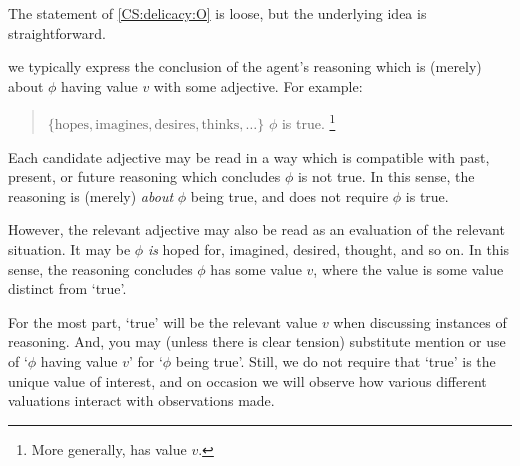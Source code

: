 \begin{note}
  The statement of \ref{CS:delicacy:O} is loose, but the underlying idea is straightforward.

  we typically express the conclusion of the agent's reasoning which is (merely) about \(\phi\) having value \(v\) with some adjective.
  For example:

  \begin{quote}
    \vAgent{} \(\{ \text{hopes}, \text{imagines}, \text{desires}, \text{thinks}, \dots \}\) \(\phi\) is true.%
    \footnote{
      More generally, has value \(v\).
    }
  \end{quote}
  Each candidate adjective may be read in a way which is compatible with past, present, or future reasoning which concludes \(\phi\) is not true.
  In this sense, the reasoning is (merely) \emph{about} \(\phi\) being true, and does not require \(\phi\) is true.

  However, the relevant adjective may also be read as an evaluation of the relevant situation.
  It may be \(\phi\) \emph{is} hoped for, imagined, desired, thought, and so on.
  In this sense, the reasoning concludes \(\phi\) has some value \(v\), where the value is some value distinct from `true'.

  For the most part, `true' will be the relevant value \(v\) when discussing instances of reasoning.
  And, you may (unless there is clear tension) substitute mention or use of `\(\phi\) having value \(v\)' for `\(\phi\) being true'.
  Still, we do not require that `true' is the unique value of interest, and on occasion we will observe how various different valuations interact with observations made.
\end{note}

